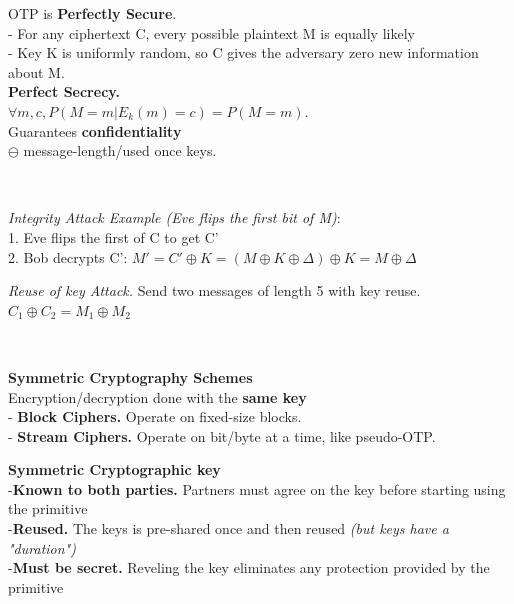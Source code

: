 \documentclass[9pt, a4paper]{extarticle}
\begin{document}
\begin{minipage}[t]{0.495\textwidth}
\begin{minipage}[t]{0.45\textwidth}
	\end{minipage}
	\begin{minipage}[t]{0.55\textwidth}
		OTP is \textbf{Perfectly Secure}.\\
		- For any ciphertext C, every possible plaintext M is equally likely\\
		- Key K is uniformly random, so C gives the adversary zero new information about M.\\
		\textbf{Perfect Secrecy.}\\$\forall m, c, P(M = m | E_{k}(m)=c) = P(M = m)$.\\
			Guarantees \textbf{confidentiality} \\ $\ominus$ message-length/used once keys.
	\end{minipage}\\
	\begin{minipage}[t]{0.6\textwidth}
		\textit{Integrity Attack Example (Eve flips the first bit of M)}:\\
		1. Eve flips the first of C to get C'\\
		2. Bob decrypts C': $M' = C' \oplus K = (M \oplus K \oplus \Delta) \oplus K  = M \oplus \Delta$
	\end{minipage}
	\begin{minipage}[t]{0.4\textwidth}
		\textit{Reuse of key Attack.}
		Send two messages of length 5 with key reuse.\\
		$C_1 \oplus C_2 = M_1 \oplus M_2$
	\end{minipage}\\
	\begin{minipage}[t]{0.39\textwidth}
		\textbf{Symmetric Cryptography Schemes}\\Encryption/decryption done with the \textbf{same key}\\
		- \textbf{Block Ciphers.} Operate on fixed-size blocks.\\
		- \textbf{Stream Ciphers.} Operate on bit/byte at a time, like pseudo-OTP.
	\end{minipage}\hfill
	\begin{minipage}[t]{0.59\textwidth}
		\textbf{Symmetric Cryptographic key}\\
		-\textbf{Known to both parties.} Partners must agree on the key before starting using the primitive\\
		-\textbf{Reused.} The keys is pre-shared once and then reused \textit{(but keys have a "duration")}\\
		-\textbf{Must be secret.} Reveling the key eliminates any protection provided by the primitive

\end{minipage}
\end{minipage}
\end{document}
